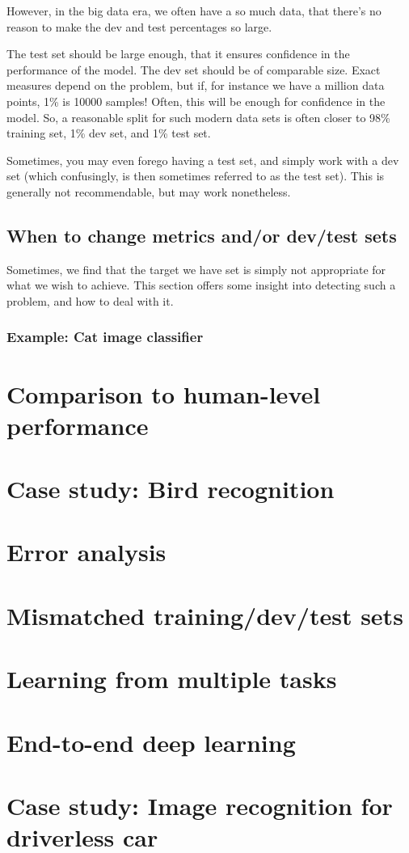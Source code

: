 \documentclass[12pt, a4paper]{article}
\numberwithin{equation}{section}
\begin{document}
However, in the big data era, we often have a so much data, that there's no reason to make the dev and test percentages so large.

The test set should be large enough, that it ensures confidence in the performance of the model. The dev set should be of comparable size. Exact measures depend on the problem, but if, for instance we have a million data points, 1\% is 10000 samples! Often, this will be enough for confidence in the model. So, a reasonable split for such modern data sets is often closer to 98\% training set, 1\% dev set, and 1\% test set.

Sometimes, you may even forego having a test set, and simply work with a dev set (which confusingly, is then sometimes referred to as the test set). This is generally not recommendable, but may work nonetheless.

\subsection{When to change metrics and/or dev/test sets}
Sometimes, we find that the target we have set is simply not appropriate for what we wish to achieve. This section offers some insight into detecting such a problem, and how to deal with it.

\subsubsection{Example: Cat image classifier}


\section{Comparison to human-level performance}


\section{Case study: Bird recognition}


\section{Error analysis}


\section{Mismatched training/dev/test sets}


\section{Learning from multiple tasks}


\section{End-to-end deep learning}


\section{Case study: Image recognition for driverless car}
\end{document}
